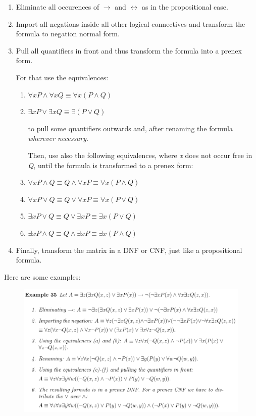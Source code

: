 \begin{enumerate}
\item Eliminate all occurences of $ \to $ and $ \leftrightarrow $ as in the propositional case.
\item Import all negations inside all other logical connectives and transform the formula to negation normal form.
\item Pull all quantifiers in front and thus transform the formula into a prenex form.

For that use the equivalences:
      \begin{enumerate}
\item $ \forall x P \land \forall x Q \equiv \forall x(P \land Q) $
\item $ \exists x P \lor \exists x Q \equiv \exists(P \lor Q) $

to pull some quantifiers outwards and, after renaming the formula \textit{wherever necessary}.

Then, use also the following equivalences, where \textit{x} does not occur free in \textit{Q}, until the formula is transformed to a prenex form:

\item $ \forall x P \land Q \equiv Q \land \forall x P \equiv \forall x(P\land Q) $
\item $ \forall x P \lor Q \equiv Q \lor \forall x P \equiv \forall x(P \lor Q) $
\item $ \exists x P \lor Q \equiv Q \lor \exists x P \equiv \exists x (P \lor Q) $
\item $ \exists x P \land Q \equiv Q \land \exists x P \equiv \exists x(P\land Q) $
\end{enumerate}
\item Finally, transform the matrix in a DNF or CNF, just like a propositional formula.
\end{enumerate}

Here are some examples:
\begin{figure}[H]
\includegraphics[scale=0.6]{./figures/prenexex.pdf}
\end{figure}

